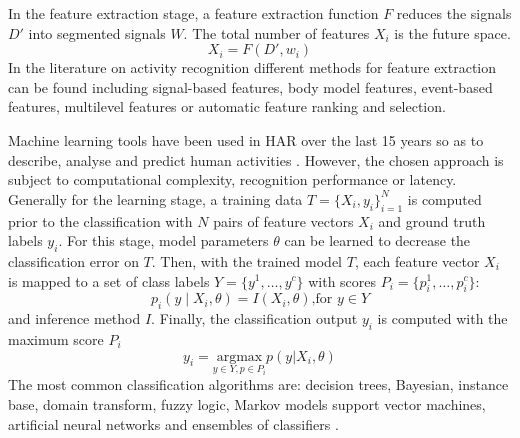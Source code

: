 \documentclass[10pt,journal,compsoc]{IEEEtran}
\begin{document}
In the feature extraction stage, 
a feature extraction function $F$ reduces
the signals $D'$  into segmented signals $W$.
The total number of features $X_i$ is the future space.
\begin{equation}
X_i = F ( D', w_i)
\end{equation} 
In the literature on activity recognition different  methods for feature extraction 
can be found including signal-based features, body model features, event-based features, 
multilevel features or automatic feature ranking and selection.


Machine learning tools have been used in HAR over the last 15 years
so as to describe, analyse and predict human activities \cite{bulling2014}.
However, the chosen approach is subject to computational complexity,
recognition performance or latency.
Generally for the learning stage, a training data $T = \{ X_i, y_i \}  ^N _ {i=1}$ 
is computed prior to the classification with $N$ pairs of feature vectors $X_i$ and ground 
truth labels $y_i$. For this stage, model parameters $\theta$ can be learned 
to decrease the classification error on $T$. 
Then, with the trained model $T$,
each feature vector $X_i$  is mapped to a set of class labels 
$Y= \{ y^1, \dots , y^c \}$ with scores $P_i = \{ p^1_i, \dots, p^c_i \}$:
\begin{equation}
p_i ( y \mid X_i, \theta) = I (X_i, \theta) \mbox{,for } y \in Y
\end{equation} 
and inference method $I$.
Finally, the classification output $y_i$ is computed with the maximum score $P_i$
\begin{equation}
y_i  = 
\underset{ y \in Y, p \in P_i }{\text{argmax}}   p(y | X_i, \theta)
\end{equation} 
The most common classification algorithms are:
decision trees, Bayesian, instance base,
domain transform, fuzzy logic, Markov models
support vector machines, artificial neural networks
and ensembles of classifiers \cite{Lara2013}.




% 
% 
% 
% 
% 
\end{document}
